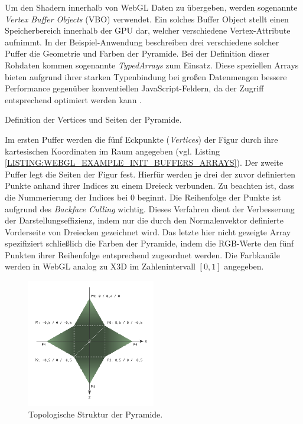 Um den Shadern innerhalb von WebGL Daten zu übergeben, werden sogenannte \emph{Vertex Buffer Objects} (VBO) verwendet. Ein solches Buffer Object stellt einen Speicherbereich innerhalb der GPU dar, welcher verschiedene Vertex-Attribute aufnimmt. In der Beispiel-Anwendung beschreiben drei verschiedene solcher Puffer die Geometrie und Farben der Pyramide.
Bei der Definition dieser Rohdaten kommen sogenannte \emph{TypedArrays} zum Einsatz. Diese speziellen Arrays bieten aufgrund ihrer starken Typenbindung bei großen Datenmengen bessere Performance gegenüber konventiellen JavaScript-Feldern, da der Zugriff entsprechend optimiert werden kann \autocite{JS_TYPED_ARRAYS}.

\smallskip
\begin{listing}[!h]
\caption{Definition der Vertices und Seiten der Pyramide.}
\label{LISTING:WEBGL_EXAMPLE_INIT_BUFFERS_ARRAYS}
\end{listing}

Im ersten Puffer werden die fünf Eckpunkte (\emph{Vertices}) der Figur durch ihre kartesischen Koordinaten im Raum angegeben (vgl. Listing \ref{LISTING:WEBGL_EXAMPLE_INIT_BUFFERS_ARRAYS}). Der zweite Puffer legt die Seiten der Figur fest. Hierfür werden je drei der zuvor definierten Punkte anhand ihrer Indices zu einem Dreieck verbunden. Zu beachten ist, dass die Nummerierung der Indices bei 0 beginnt. Die Reihenfolge der Punkte ist aufgrund des \emph{Backface Culling} wichtig. Dieses Verfahren dient der Verbesserung der Darstellungseffizienz, indem nur die durch den Normalenvektor definierte Vorderseite von Dreiecken gezeichnet wird. Das letzte hier nicht gezeigte Array spezifiziert schließlich die Farben der Pyramide, indem die RGB-Werte den fünf Punkten ihrer Reihenfolge entsprechend zugeordnet werden. Die Farbkanäle werden in WebGL analog zu X3D im Zahlenintervall $[0,1]$ angegeben.

\smallskip
\begin{figure}[!htb]
	\centering
	\includegraphics[width=0.5\textwidth]{kap4/webgl/figures/pyramid_sketch-crop.pdf}
	\caption{Topologische Struktur der Pyramide.}
	\label{FIG:WEBGL_EXAMPLE_PYRAMID_SKETCH}
\end{figure}

